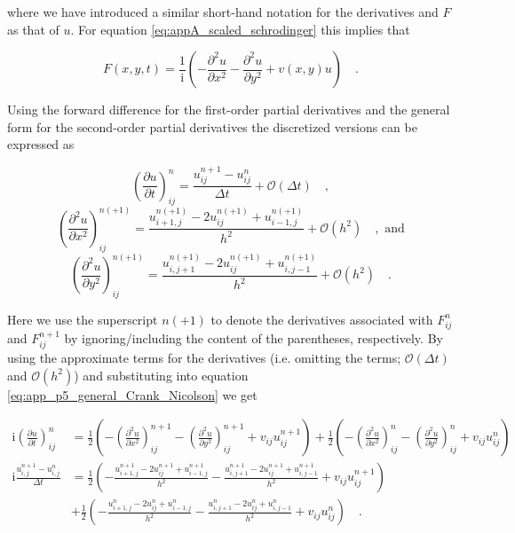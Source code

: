 \documentclass[../main_proj5.tex]{subfiles}
\begin{document}
\noindent where we have introduced a similar short-hand notation for the derivatives and $F$ as that of $u$. For equation \eqref{eq:appA_scaled_schrodinger} this implies that 

\begin{equation*}
    F(x,y,t) = \frac{1}{\text{i}}\left(-\frac{\partial^{2}u}{\partial x^{2}} - \frac{\partial^{2} u}{\partial y^{2}} + v(x,y ) u\right) \quad.
\end{equation*}

\noindent Using the forward difference for the first-order partial derivatives and the general form for the second-order partial derivatives the discretized versions can be expressed as 

\begin{equation*}
    \left(\frac{\partial u}{\partial t} \right)_{ij}^n = \frac{u_{ij}^{n+1} -u_{ij}^{n}}{\Delta t} + \mathcal{O}(\Delta t)\quad, 
\end{equation*}
\begin{equation*}
    \left(\frac{\partial^{2} u}{\partial x^{2}} \right)_{ij}^{n(+1)} 
    = \frac{u_{i+1, j}^{n(+1)} -2u_{ij}^{n(+1)} + u_{i-1, j}^{n(+1)}}{h^{2}} 
    +\mathcal{O}(h^{2})\quad, \text{ and}
\end{equation*}
\begin{equation*}
    \left(\frac{\partial^{2} u}{\partial y^{2}} \right)_{ij}^{n(+1)} 
    = \frac{u_{i, j+1}^{n(+1)} -2u_{ij}^{n(+1)} + u_{i, j-1}^{n(+1)}}{h^{2}} 
    +\mathcal{O}(h^{2})\quad.
\end{equation*}

\noindent Here we use the superscript $n(+1)$ to denote the derivatives associated with $F_{ij}^n$ and $F_{ij}^{n+1}$ by ignoring/including the content of the parentheses, respectively. By using the approximate terms for the derivatives (i.e. omitting the terms; $\mathcal{O}(\Delta t)$ and $\mathcal{O}(h^{2})$) and substituting into equation \eqref{eq:app_p5_general_Crank_Nicolson} we get

\begin{equation}
\begin{split}
    \text{i}\left(\frac{\partial u}{\partial t} \right)_{ij}^n 
    & = \frac{1}{2}\left(
    -\left(\frac{\partial^{2}u}{\partial x^{2}}\right)_{ij}^{n+1} 
    - \left(\frac{\partial^{2} u}{\partial y^{2}}\right)_{ij}^{n+1} 
    + v_{ij} u_{ij}^{n+1}
    \right)
    + \frac{1}{2}\left( 
    -\left(\frac{\partial^{2}u}{\partial x^{2}}\right)_{ij}^{n} 
    - \left(\frac{\partial^{2} u}{\partial y^{2}}\right)_{ij}^{n} 
    + v_{ij} u_{ij}^{n}
    \right) \\
    \text{i} \frac{u_{i,j}^{n+1} - u_{i,j}^{n}}{\Delta t} &=
    \frac{1}{2}\left(
    - \frac{u_{i+1, j}^{n+1} -2u_{ij}^{n+1} + u_{i-1, j}^{n+1}}{h^{2}} 
    - \frac{u_{i, j+1}^{n+1} -2u_{ij}^{n+1} + u_{i, j-1}^{n+1}}{h^{2}} 
    + v_{ij} u_{ij}^{n+1}
    \right) \\
    &+\frac{1}{2}\left(
    - \frac{u_{i+1, j}^{n} -2u_{ij}^{n} + u_{i-1, j}^{n}}{h^{2}} 
    - \frac{u_{i, j+1}^{n} -2u_{ij}^{n} + u_{i, j-1}^{n}}{h^{2}} 
    + v_{ij} u_{ij}^{n}
    \right) \quad.
    \end{split}   
\end{equation}
\end{document}
